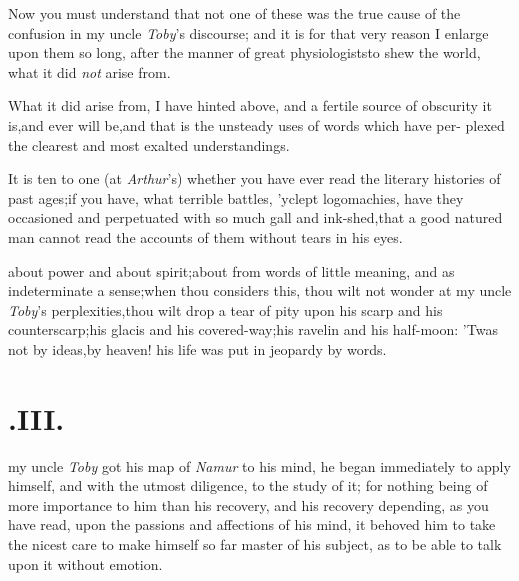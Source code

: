 \documentclass{article}
\begin{document}
Now you must understand that not one of these was the true cause
of the confusion in my uncle \textit{Toby}’s discourse; and it
is for that very reason I enlarge upon them so long, after the
manner of great physiologists\tsk to shew the world, what it did
\textit{not} arise from.

What it did arise from, I have hinted above, and a fertile
source of obscurity it is,\tsk and ever will be,\tsk and that
is the unsteady uses of words which have per- plexed the clearest
and most exalted understandings.

It is ten to one (at \textit{Arthur}’s) whether you have
ever read the literary histories of past ages;\tsk if you
have,\tsk
what terrible battles, ’yclept logomachies, have they
occasioned and perpetuated with so much gall and
ink-shed,\tsk that a good natured man cannot read the accounts of
them without tears in his eyes.

\noindent
{}
about power and about spirit;\tsk about
from words of little meaning, and as
indeterminate a sense;\tsk when thou consi\-ders this, thou wilt not
wonder at my uncle \textit{Toby}’s perplexities,\tsk thou
wilt drop a tear of pity upon his scarp and his
counterscarp;\tsk his glacis and his covered-way;\tsk his
ravelin and his half-moon:\break
’Twas not by ideas,\tsh by heaven!\break
his life was put in jeopardy by words.

\bigskip

\section{.\enspace  III.}

 my uncle \textit{Toby} got his map
of \textit{Namur} to his mind, he began immediately to apply himself,
and with the utmost diligence, to the study of it; for
nothing being of more importance to him than his
recovery, and his
reco\-very depending, as you have read, upon the passions and
affections of his mind, it behoved him to take the nicest care to
make himself so far master of his subject, as to be able to talk
upon it without emotion.
\end{document}

